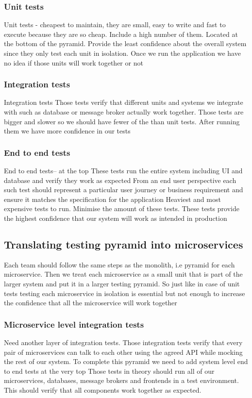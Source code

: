 \subsubsection{Unit tests}
Unit tests - cheapest to maintain, they are small, easy to write and fast to execute because they are so cheap.
Include a high number of them.
Located at the bottom of the pyramid.
Provide the least confidence about the overall system since they only test each unit in isolation.
Once we run the application we have no idea if those units will work together or not

\subsubsection{Integration tests}
Integration tests
Those tests verify that different units and systems we integrate with such as database or message broker actually work together.
Those tests are bigger and slower so we should have fewer of the than unit tests.
After running them we have more confidence in our tests

\subsubsection{End to end tests}
End to end tests-- at the top
These tests run the entire system including UI and database and verify they work as expected
From an end user perspective each such test should represent a particular user journey or business requirement and ensure it matches the specification for the application
Heaviest and most expensive tests to run.
Minimise the amount of these tests.
These tests provide the highest confidence that our system will work as intended in production

\subsection{Translating testing pyramid into microservices}
Each team should follow the same steps as the monolith, i.e pyramid for each microservice.
Then we treat each microservice as a small unit that is part of the larger system and put it in a larger testing pyramid.
So just like in case of unit tests testing each microservice in isolation is essential but not enough to increase the confidence that all the microservice will work together

\subsubsection{Microservice level integration tests}
Need another layer of integration tests.
Those integration tests verify that every pair of microservices can talk to each other using the agreed API while mocking the rest of our system.
To complete this pyramid we need to add system level end to end tests at the very top
Those tests in theory should run all of our microservices, databases, message brokers and frontends in a test environment.
This should verify that all components work together as expected.

